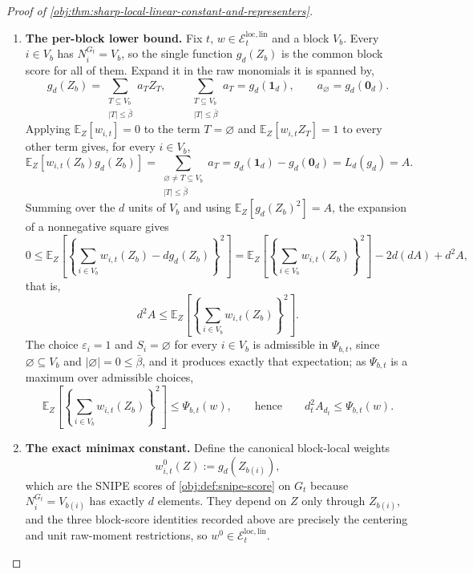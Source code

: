 \documentclass[11pt]{article}
\begin{document}
\begin{proof}[Proof of \cref{obj:thm:sharp-local-linear-constant-and-representers}]
\begin{enumerate}
\item \textbf{The per-block lower bound.}  Fix \(t\), \(w\in\mathcal E_t^{\mathrm{loc,lin}}\) and a block \(V_b\).  Every \(i\in V_b\) has \(N_i^{G_t}=V_b\), so the single function \(g_{d}(Z_b)\) is the common block score for all of them.  Expand it in the raw monomials it is spanned by,
\[
g_{d}(Z_b)=\sum_{\substack{T\subseteq V_b\\ |T|\le\bar\beta}}a_TZ_T,
\qquad
\sum_{\substack{T\subseteq V_b\\ |T|\le\bar\beta}}a_T=g_{d}(\mathbf 1_{d}),
\qquad
a_\varnothing=g_{d}(\mathbf 0_{d}).
\]
Applying \(\mathbb E_Z[w_{i,t}]=0\) to the term \(T=\varnothing\) and \(\mathbb E_Z[w_{i,t}Z_T]=1\) to every other term gives, for every \(i\in V_b\),
\[
\mathbb E_Z[w_{i,t}(Z_b)g_{d}(Z_b)]
=
\sum_{\substack{\varnothing\ne T\subseteq V_b\\ |T|\le\bar\beta}}a_T
=
g_{d}(\mathbf 1_{d})-g_{d}(\mathbf 0_{d})
=
L_{d}(g_{d})
=
A .
\]
Summing over the \(d\) units of \(V_b\) and using \(\mathbb E_Z[g_{d}(Z_b)^2]=A\), the expansion of a nonnegative square gives
\[
0\le
\mathbb E_Z\!\left[
\left\{\sum_{i\in V_b}w_{i,t}(Z_b)-dg_{d}(Z_b)\right\}^2
\right]
=
\mathbb E_Z\!\left[
\left\{\sum_{i\in V_b}w_{i,t}(Z_b)\right\}^2
\right]
-2d(dA)+d^2A ,
\]
that is,
\[
d^2A
\le
\mathbb E_Z\!\left[
\left\{\sum_{i\in V_b}w_{i,t}(Z_b)\right\}^2
\right].
\]
The choice \(\varepsilon_i=1\) and \(S_i=\varnothing\) for every \(i\in V_b\) is admissible in \(\Psi_{b,t}\), since \(\varnothing\subseteq V_b\) and \(|\varnothing|=0\le\bar\beta\), and it produces exactly that expectation; as \(\Psi_{b,t}\) is a maximum over admissible choices,
\[
\mathbb E_Z\!\left[
\left\{\sum_{i\in V_b}w_{i,t}(Z_b)\right\}^2
\right]
\le\Psi_{b,t}(w),
\qquad\text{hence}\qquad
d_t^2A_{d_t}\le \Psi_{b,t}(w).
\]

\item \textbf{The exact minimax constant.}  Define the canonical block-local weights
\[
w^0_{i,t}(Z):=g_{d}(Z_{b(i)}),
\]
which are the SNIPE scores of \cref{obj:def:snipe-score} on \(G_t\) because \(N_i^{G_t}=V_{b(i)}\) has exactly \(d\) elements.  They depend on \(Z\) only through \(Z_{b(i)}\), and the three block-score identities recorded above are precisely the centering and unit raw-moment restrictions, so \(w^0\in\mathcal E_t^{\mathrm{loc,lin}}\). %


\end{enumerate}
\end{proof}
\end{document}
